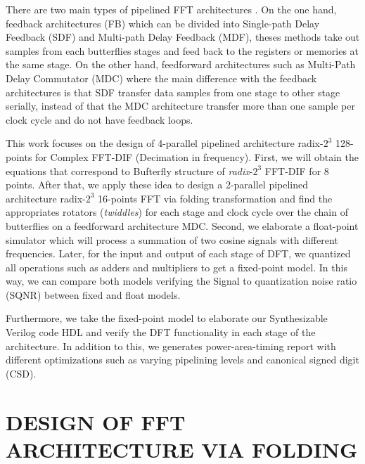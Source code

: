 \documentclass[journal,comsoc]{IEEEtran}
\begin{document}
There are two main types of pipelined FFT architectures \cite{shousheng_he_designing_1998}. On the one hand, feedback architectures (FB) which can be divided into Single-path Delay Feedback (SDF) and Multi-path Delay Feedback (MDF), theses methods take out samples from each butterflies stages and feed back to the registers or memories at the same stage. On the other hand, feedforward architectures such as Multi-Path Delay Commutator (MDC) where the main difference with the feedback architectures is that SDF transfer data samples from one stage to other stage serially, instead of that the MDC architecture transfer more than one sample per clock cycle and do not have feedback loops.

This work focuses on the design of 4-parallel pipelined architecture radix-$2^3$ 128-points for Complex FFT-DIF (Decimation in frequency). First, we will obtain the equations that correspond to Bufterfly structure of \textit{radix}-$2^3$ FFT-DIF for 8 points. After that, we apply these idea to design a 2-parallel pipelined architecture radix-$2^3$ 16-points FFT via folding transformation and find the appropriates rotators (\textit{twiddles}) for each stage and clock cycle over the chain of butterflies on a feedforward architecture MDC. Second, we elaborate a float-point simulator which will process a summation of two cosine signals with different frequencies. Later, for the input and output of each stage of DFT, we quantized all operations such as adders and multipliers to get a fixed-point model. In this way, we can compare both models verifying the Signal to quantization noise ratio (SQNR) between fixed and float models.

Furthermore, we take the fixed-point model to elaborate our Synthesizable Verilog code HDL and verify the DFT functionality in each stage of the architecture. In addition to this, we generates power-area-timing report with different optimizations such as varying pipelining levels and canonical signed digit (CSD).
\section{DESIGN OF FFT ARCHITECTURE VIA FOLDING}
\end{document}
